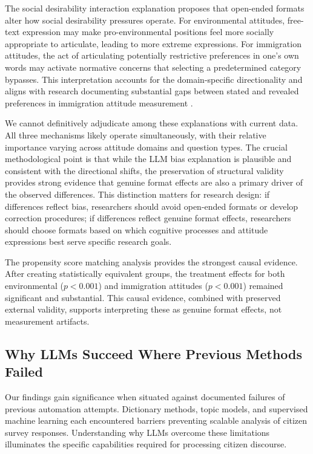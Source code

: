 \documentclass[
  journal=ram,
  manuscript=article-type,
  year=2025,
  volume=unpublished,
]{cup-journal}
\begin{document}
The social desirability interaction explanation proposes that open-ended formats alter how social desirability pressures operate.
For environmental attitudes, free-text expression may make pro-environmental positions feel more socially appropriate to articulate, leading to more extreme expressions.
For immigration attitudes, the act of articulating potentially restrictive preferences in one's own words may activate normative concerns that selecting a predetermined category bypasses.
This interpretation accounts for the domain-specific directionality and aligns with research documenting substantial gaps between stated and revealed preferences in immigration attitude measurement \citep{hainmueller_hopkins14}.

We cannot definitively adjudicate among these explanations with current data.
All three mechanisms likely operate simultaneously, with their relative importance varying across attitude domains and question types.
The crucial methodological point is that while the LLM bias explanation is plausible and consistent with the directional shifts, the preservation of structural validity provides strong evidence that genuine format effects are also a primary driver of the observed differences.
This distinction matters for research design: if differences reflect bias, researchers should avoid open-ended formats or develop correction procedures; if differences reflect genuine format effects, researchers should choose formats based on which cognitive processes and attitude expressions best serve specific research goals.

The propensity score matching analysis provides the strongest causal evidence. After creating statistically equivalent groups, the treatment effects for both environmental ($p < 0.001$) and immigration attitudes ($p < 0.001$) remained significant and substantial. This causal evidence, combined with preserved external validity, supports interpreting these as genuine format effects, not measurement artifacts.

\subsection{Why LLMs Succeed Where Previous Methods Failed}

Our findings gain significance when situated against documented failures of previous automation attempts. Dictionary methods, topic models, and supervised machine learning each encountered barriers preventing scalable analysis of citizen survey responses. Understanding why LLMs overcome these limitations illuminates the specific capabilities required for processing citizen discourse.
\end{document}

